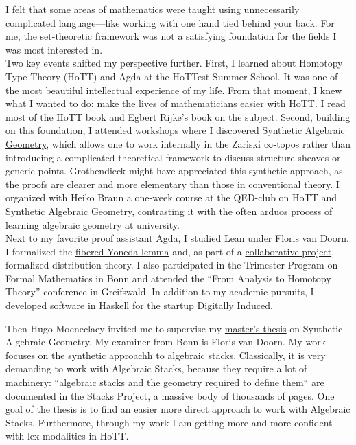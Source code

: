 \documentclass[12pt,headings=small,paper=A4,DIV=calc]{article}
\begin{document}
I felt that some areas of mathematics were taught using unnecessarily complicated language---like working with one hand tied behind your back. For me, the set-theoretic framework was not a satisfying foundation for the fields I was most interested in. \\
Two key events shifted my perspective further. First, I learned about Homotopy Type Theory (HoTT) and Agda at the HoTTest Summer School. It was one of the most beautiful intellectual experience of my life. From that moment, I knew what I wanted to do: make the lives of mathematicians easier with HoTT. I read most of the HoTT book and Egbert Rijke's book on the subject. 
Second, building on this foundation, I attended workshops where I discovered \href{https://github.com/felixwellen/synthetic-zariski}{Synthetic Algebraic Geometry}, which allows one to work internally in the Zariski $\infty$-topos rather than introducing a complicated theoretical framework to discuss structure sheaves or generic points. Grothendieck might have appreciated this synthetic approach, as the proofs are clearer and more elementary than those in conventional theory. I organized with Heiko Braun a one-week course at the QED-club on HoTT and Synthetic Algebraic Geometry, contrasting it with the often arduos process of learning algebraic geometry at university. \\
Next to my favorite proof assistant Agda, I studied Lean under Floris van Doorn. I formalized the \href{https://github.com/timlichtnau/LeanCourse23/tree/master/LeanCourse/Project}{fibered Yoneda lemma} and, as part of a \href{https://github.com/timlichtnau/BonnAnalysis/tree/master/BonnAnalysis}{collaborative project}, formalized distribution theory. I also participated in the Trimester Program on Formal Mathematics in Bonn and attended the ``From Analysis to Homotopy Theory'' conference in Greifswald. In addition to my academic pursuits, I developed software in Haskell for the startup \href{https://www.digitallyinduced.com/}{Digitally Induced}. 

Then Hugo Moeneclaey invited me to supervise my \href{https://github.com/timlichtnau/MasterThesis/blob/Main}{master's thesis} on Synthetic Algebraic Geometry. My examiner from Bonn is Floris van Doorn. My work focuses on the synthetic approachh to algebraic stacks. Classically, it is very demanding to work with Algebraic Stacks, because they require a lot of machinery: ``algebraic stacks and the geometry required to define them`` are documented in the Stacks Project, a massive body of thousands of pages. One goal of the thesis is to find an easier more direct approach to work with Algebraic Stacks. Furthermore, through my work I am getting more and more confident with lex modalities in HoTT. 
\end{document}
